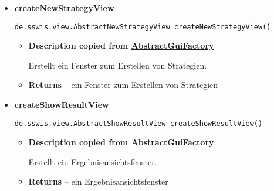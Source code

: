 {{{{{{{\begin{itemize}
{\begin{itemize}
{Erstellt ein Fenster zum Erstellen von Initialisierungen.
}
\item{{\bf  Returns} -- 
ein Fenster zum Erstellen von Initialisierungen 
}%
\end{itemize}
}%
\item{ 
\hypertarget{de.sswis.controller.SwingGuiFactory.createNewStrategyView()}{{\bf  createNewStrategyView}\\}
\begin{lstlisting}[frame=none]
de.sswis.view.AbstractNewStrategyView createNewStrategyView()\end{lstlisting} %
\begin{itemize}
\item{
{\bf  Description copied from \hyperlink{de.sswis.controller.AbstractGuiFactory}{AbstractGuiFactory}{\small {}} }

Erstellt ein Fenster zum Erstellen von Strategien.
}
\item{{\bf  Returns} -- 
ein Fenster zum Erstellen von Strategien 
}%
\end{itemize}
}%
\item{ 
\hypertarget{de.sswis.controller.SwingGuiFactory.createShowResultView()}{{\bf  createShowResultView}\\}
\begin{lstlisting}[frame=none]
de.sswis.view.AbstractShowResultView createShowResultView()\end{lstlisting} %
\begin{itemize}
\item{
{\bf  Description copied from \hyperlink{de.sswis.controller.AbstractGuiFactory}{AbstractGuiFactory}{\small {}} }

Erstellt ein Ergebnisansichtsfenster.
}
\item{{\bf  Returns} -- 
ein Ergebnisansichtsfenster 
}%
\end{itemize}
}%
\end{itemize}
}
}
}
}}}}
